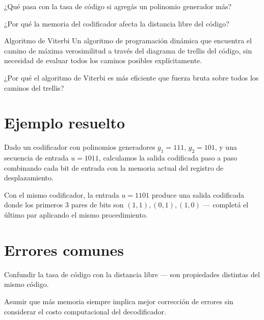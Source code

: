 \documentclass[11pt,openany]{book}
\begin{document}
\begin{chequeo}
\item ¿Qué pasa con la tasa de código si agregás un polinomio generador más?
\item ¿Por qué la memoria del codificador afecta la distancia libre del código?
\end{chequeo}

\begin{bloque}{Algoritmo de Viterbi}
Un algoritmo de programación dinámica que encuentra el camino de máxima verosimilitud a través del diagrama de trellis del código, sin necesidad de evaluar todos los caminos posibles explícitamente.
\end{bloque}

\begin{chequeo}
\item ¿Por qué el algoritmo de Viterbi es más eficiente que fuerza bruta sobre todos los caminos del trellis?
\end{chequeo}

\section{Ejemplo resuelto}

\begin{ejemplo}[completo]
Dado un codificador con polinomios generadores $g_1 = 111$, $g_2 = 101$, y una secuencia de entrada $u = 1011$, calculamos la salida codificada paso a paso combinando cada bit de entrada con la memoria actual del registro de desplazamiento.
\end{ejemplo}

\begin{ejemplo}[parcial]
Con el mismo codificador, la entrada $u = 1101$ produce una salida codificada donde los primeros 3 pares de bits son $(1,1), (0,1), (1,0)$ — completá el último par aplicando el mismo procedimiento.
\end{ejemplo}

\section{Errores comunes}
\begin{erroresComunes}
  \item Confundir la tasa de código con la distancia libre — son propiedades distintas del mismo código.
  \item Asumir que más memoria siempre implica mejor corrección de errores sin considerar el costo computacional del decodificador.
\end{erroresComunes}
\end{document}
